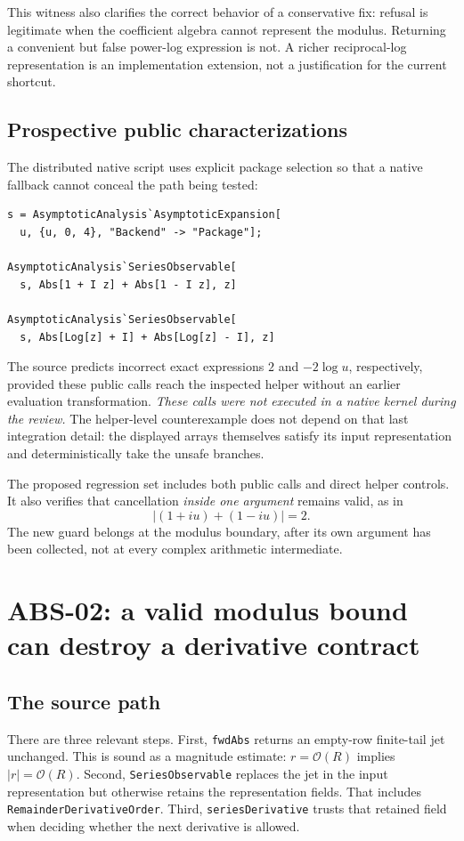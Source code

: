 \documentclass[11pt,a4paper]{article}
\newcommand{\code}[1]{\nolinkurl{#1}}
\newcommand{\OO}{\mathcal O}
\begin{document}
This witness also clarifies the correct behavior of a conservative fix: refusal is legitimate when the coefficient algebra cannot represent the modulus. Returning a convenient but false power-log expression is not. A richer reciprocal-log representation is an implementation extension, not a justification for the current shortcut.

\subsection{Prospective public characterizations}

The distributed native script uses explicit package selection so that a native fallback cannot conceal the path being tested:
\begin{lstlisting}
s = AsymptoticAnalysis`AsymptoticExpansion[
  u, {u, 0, 4}, "Backend" -> "Package"];

AsymptoticAnalysis`SeriesObservable[
  s, Abs[1 + I z] + Abs[1 - I z], z]

AsymptoticAnalysis`SeriesObservable[
  s, Abs[Log[z] + I] + Abs[Log[z] - I], z]
\end{lstlisting}
The source predicts incorrect exact expressions $2$ and $-2\log u$, respectively, provided these public calls reach the inspected helper without an earlier evaluation transformation. \emph{These calls were not executed in a native kernel during the review.} The helper-level counterexample does not depend on that last integration detail: the displayed arrays themselves satisfy its input representation and deterministically take the unsafe branches.

The proposed regression set includes both public calls and direct helper controls. It also verifies that cancellation \emph{inside one argument} remains valid, as in
\[
 \left|(1+i u)+(1-i u)\right|=2.
\]
The new guard belongs at the modulus boundary, after its own argument has been collected, not at every complex arithmetic intermediate.

\section{ABS-02: a valid modulus bound can destroy a derivative contract}
\subsection{The source path}

There are three relevant steps. First, \code{fwdAbs} returns an empty-row finite-tail jet unchanged. This is sound as a magnitude estimate: $r=\OO(R)$ implies $|r|=\OO(R)$. Second, \code{SeriesObservable} replaces the jet in the input representation but otherwise retains the representation fields. That includes \code{RemainderDerivativeOrder}. Third, \code{seriesDerivative} trusts that retained field when deciding whether the next derivative is allowed.\cite{core,operations}
\end{document}
